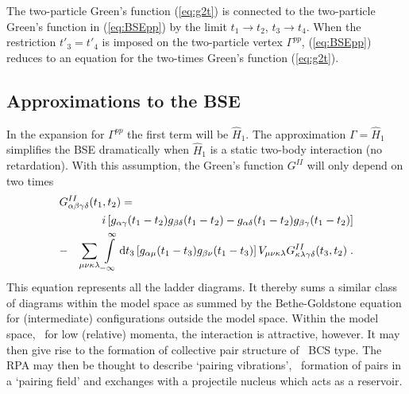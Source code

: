 The two-particle Green's function (\ref{eq:g2t}) is connected to the 
two-particle Green's function in (\ref{eq:BSEpp}) by the limit 
 $t_1 \rightarrow t_2$, $t_3 \rightarrow t_4$. When the 
restriction $t'_3=t'_4$ is imposed on the two-particle vertex
 $\Gamma^{pp}$, (\ref{eq:BSEpp}) reduces to an equation for the two-times
Green's function (\ref{eq:g2t}). 

\subsection{Approximations to the BSE}
In the expansion for $\Gamma^{pp}$ the
first term will be $\hat{H}_1$. 
The approximation $\Gamma=\hat{H}_1$ simplifies the BSE 
dramatically when $\hat{H}_1$ is a static two-body interaction (no retardation).
With this assumption, the Green's function $G^{II}$  will only
depend on two times
%
	\begin{eqnarray}
	\lefteqn{%
		G^{II}_{\alpha\beta\gamma\delta}
		         (t_1, t_2) 
	=} && \label{eq:BSEHpp} \\
	&&
	i\left[
		g_{\alpha\gamma}(t_1-t_2)
		g_{\beta\delta}(t_1-t_2)
	-
		g_{\alpha\delta}(t_1-t_2)
		g_{\beta\gamma}(t_1-t_2)
	\right]
	\nonumber \\
	&-&
		\sum_{\mu\nu\kappa\lambda}
 		\int\limits_{-\infty}^{\infty} 
		{\rm d} t_3 
	\left[
		g_{\alpha\mu}(t_1-t_3)
		g_{\beta\nu}(t_1-t_3)
	\right]
		V_{\mu\nu\kappa\lambda}
		G^{II}_{\kappa\lambda\gamma\delta}
		(t_3, t_2) 
	\nonumber
	\;.
	\end{eqnarray}
%
This equation represents  all the ladder diagrams. It thereby sums a similar
class of diagrams within the model space as summed by the Bethe-Goldstone
equation for (intermediate) configurations outside the model space.
Within the model space, \ie\ for low (relative) momenta, the interaction is 
attractive, however. It may then give rise to the formation of collective pair 
structure of \eg\ BCS type\cite{BCS57}. The RPA may then be thought to describe 
`pairing vibrations'\cite{BHR73,RS80}, \ie\ formation of pairs in a 
`pairing field' and exchanges with a projectile nucleus which acts as a 
reservoir.

